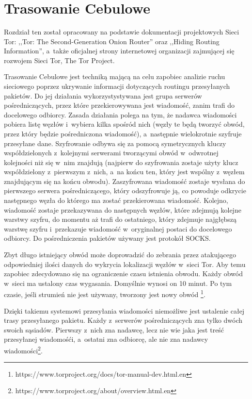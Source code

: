 \section{Trasowanie Cebulowe}\paragraph{}
Rozdział ten został opracowany na podstawie dokumentacji projektowych Sieci Tor: ,,Tor: The Second-Generation Onion Router'' oraz ,,Hiding Routing Information'', a~także oficjalnej strony internetowej organizacji zajmującej się rozwojem Sieci Tor, The Tor Project.

Trasowanie Cebulowe jest techniką mającą na celu zapobiec analizie ruchu sieciowego poprzez ukrywanie informacji dotyczących routingu przesyłanych pakietów. Do jej działania wykorzystystywana jest grupa serwerów pośredniczących, przez które przekierowywana jest wiadomość, zanim trafi do docelowego odbiorcy. Zasada działania polega na tym, że nadawca wiadomości pobiera listę węzłów i~wybiera kilka spośród nich (węzły te będą tworzyć obwód, przez który będzie pośredniczona wiadomość), a~następnie wielokrotnie szyfruje  przesyłane dane. Szyfrowanie odbywa się za pomocą symetrycznych kluczy współdzielonych z~kolejnymi serwerami tworzącymi obwód w~odwrotnej kolejności niż się w~nim znajdują (najpierw do szyfrowania zostaje użyty klucz współdzielony z~pierwszym z~nich, a~na końcu ten, który jest wspólny z~węzłem znajdującym się na końcu obwodu). Zaszyfrowana wiadomość zostaje wysłana do pierwszego serwera pośredniczącego, który odszyfrowuje ją, co powoduje odkrycie następnego węzła do którego ma zostać przekierowana wiadomość. Kolejno, wiadomość zostaje przekazywana do następnych węzłów, które zdejmują kolejne warstwy szyfru, do momentu aż trafi do ostatniego, który zdejmuje najgłębszą warstwę szyfru i~przekazuje wiadomość w~oryginalnej postaci do docelowego odbiorcy. Do pośredniczenia pakietów używany jest protokół SOCKS.

Zbyt długo istniejący obwód może doprowadzić do zebrania przez atakującego odpowiedniej ilości danych do wykrycia lokalizacji węzłów w~sieci Tor. Aby temu zapobiec zdecydowano się na ograniczenie czasu istnienia obwodu. Każdy obwód w~sieci ma ustalony czas wygasania. Domyślnie wynosi on 10 minut. Po tym czasie, jeśli strumień nie jest używany, tworzony jest nowy obwód \footnote{https://www.torproject.org/docs/tor-manual-dev.html.en}.

Dzięki takiemu systemowi przesyłania wiadomości niemożliwe jest ustalenie całej trasy przesyłanego pakietu. Każdy z~serwerów pośredniczących zna tylko dwóch swoich sąsiadów. Pierwszy z~nich zna nadawcę, lecz nie wie jaka jest treść przesyłanej wiadomośći, a~ostatni zna odbiorcę, ale nie zna nadawcy wiadomości\footnote{https://www.torproject.org/about/overview.html.en}.

